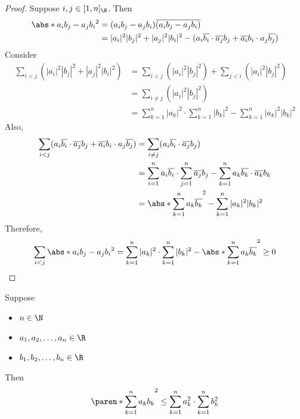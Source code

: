 \begin{proof}
  Suppose $i, j \in [1, n]_{\N}$. Then
  \begin{align*}
    \abs*{{a_{i} b_{j} - a_{j} b_{i}}}^{2}
     & = (a_{i} b_{j} - a_{j} b_{i}) \overline{(a_{i} b_{j} - a_{j} b_{i})}          \\
     & = |a_{i}|^{2} |b_{j}|^{2} + |a_{j}|^{2} |b_{i}|^{2} - (a_{i} \overline{b_{i}}
    \cdot \overline{a_{j}} b_{j} + \overline{a_{i}} b_{i} \cdot a_{j} \overline{b_{j}})
  \end{align*}
  Consider
  \begin{align*}
    \sum_{i < j} (|a_{i}|^{2} |b_{j}|^{2} + |a_{j}|^{2} |b_{i}|^{2})
     & = \sum_{i < j} (|a_{i}|^{2} |b_{j}|^{2}) + \sum_{j < i} (|a_{i}|^{2} |b_{j}|^{2}) \\
     & = \sum_{i \neq j} (|a_{i}|^{2} |b_{j}|^{2})                                       \\
     & = \sum_{k = 1}^{n} |a_{k}|^{2}
    \cdot \sum_{k = 1}^{n} |b_{k}|^{2} - \sum_{k = 1}^{n} |a_{k}|^{2} |b_{k}|^{2}
  \end{align*}
  Also,
  \begin{align*}
    \sum_{i < j} (a_{i} \overline{b_{i}} \cdot \overline{a_{j}} b_{j}
    + \overline{a_{i}} b_{i} \cdot a_{j} \overline{b_{j}})
     & = \sum_{i \neq j} (a_{i} \overline{b_{i}} \cdot \overline{a_{j}} b_{j})                         \\
     & = \sum_{i = 1}^{n} a_{i} \overline{b_{i}} \cdot \sum_{j = 1}^{n} \overline{a_{j}} b_{j}
    - \sum_{k = 1}^{n} a_{k} \overline{b_{k}} \cdot \overline{a_{k}} b_{k}                             \\
     & = \abs*{\sum_{k = 1}^{n} a_{k} \overline{b_{k}}}^{2} - \sum_{k = 1}^{n} |a_{k}|^{2} |b_{k}|^{2}
  \end{align*}
  Therefore,
  \[
    \sum_{i < j} \abs*{{a_{i} b_{j} - a_{j} b_{i}}}^{2} = \sum_{k = 1}^{n} |a_{k}|^{2} \cdot
    \sum_{k = 1}^{n} |b_{k}|^{2} - \abs*{\sum_{k = 1}^{n} a_{k} \overline{b_{k}}}^{2} \geq 0
  \]
\end{proof}

\begin{corollary} \label{an:cor:cauchy-schwarz-inequality-for-real-numbers}
  Suppose
  \begin{itemize}
    \item $n \in \N$
    \item $a_{1}, a_{2}, \ldots, a_{n} \in \R$
    \item $b_{1}, b_{2}, \ldots, b_{n} \in \R$
  \end{itemize}
  Then
  \[
    \paren*{\sum_{k = 1}^{n} a_{k} b_{k}}^{2} \leq \sum_{k = 1}^{n} a_{k}^{2} \cdot \sum_{k = 1}^{n} b_{k}^{2}
  \]
\end{corollary}

